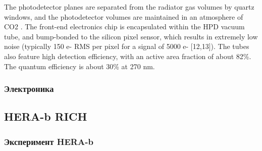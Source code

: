 The photodetector planes are separated from the radiator gas volumes by quartz windows, and the photodetector volumes are maintained in an atmosphere of CO2 . The front-end electronics chip is encapsulated within the HPD vacuum tube, and bump-bonded to the silicon pixel sensor, which results in extremely low noise (typically 150 e- RMS per pixel for a signal of 5000 e- [12,13]). The tubes also feature high detection efficiency, with an active area fraction of about 82\%. The quantum efficiency is about 30\% at 270 nm.

\subsubsection{Электроника}



\subsection{HERA-b RICH}\label{sec:HerabRich}


\subsubsection{Эксперимент HERA-b}

